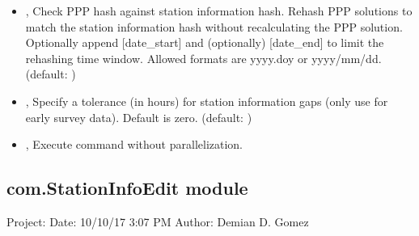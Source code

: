 \documentclass[letterpaper,10pt,english]{sphinxmanual}
\begin{document}
\begin{itemize}
\item {} 
\sphinxAtStartPar
{\hyperref[\detokenize{com:ScanArchive.py--rehash}]{}} , {\hyperref[\detokenize{com:ScanArchive.py---rehash}]{}}  \sphinxhyphen{} Check PPP hash against station information hash. Rehash PPP solutions to match the station information hash without recalculating the PPP solution. Optionally append {[}date\_start{]} and (optionally) {[}date\_end{]} to limit the rehashing time window. Allowed formats are yyyy.doy or yyyy/mm/dd. (default: )

\item {} 
\sphinxAtStartPar
{\hyperref[\detokenize{com:ScanArchive.py--tol}]{}} , {\hyperref[\detokenize{com:ScanArchive.py---stninfo_tolerant}]{}}  \sphinxhyphen{} Specify a tolerance (in hours) for station information gaps (only use for early survey data). Default is zero. (default: \sphinxcode{\sphinxupquote{{[}0{]}}})

\item {} 
\sphinxAtStartPar
{\hyperref[\detokenize{com:ScanArchive.py--np}]{}}, {\hyperref[\detokenize{com:ScanArchive.py---noparallel}]{}} \sphinxhyphen{} Execute command without parallelization.

\end{itemize}


\subsection{com.StationInfoEdit module}
\label{\detokenize{com:module-com.StationInfoEdit}}\label{\detokenize{com:com-stationinfoedit-module}}
\sphinxAtStartPar
Project:
Date: 10/10/17 3:07 PM
Author: Demian D. Gomez
\end{document}
